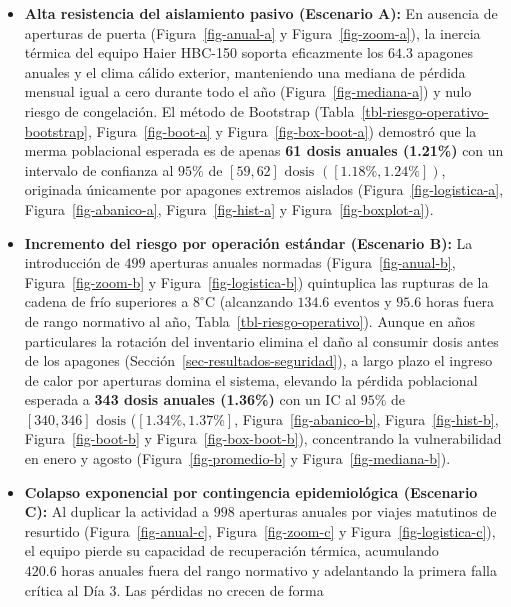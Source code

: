 \documentclass[
  spanish,
  us-letterpaper,
]{scrreprt}
\providecommand{\tightlist}{%
  \setlength{\itemsep}{0pt}\setlength{\parskip}{0pt}}
\numberwithin{equation}{section}
\theoremstyle{plain}
\theoremstyle{plain}
\theoremstyle{plain}
\theoremstyle{definition}
\theoremstyle{remark}
\begin{document}
\begin{itemize}
\tightlist
\item
  \textbf{Alta resistencia del aislamiento pasivo (Escenario A):} En
  ausencia de aperturas de puerta (Figura~\ref{fig-anual-a} y
  Figura~\ref{fig-zoom-a}), la inercia térmica del equipo Haier HBC-150
  soporta eficazmente los \(64.3\) apagones anuales y el clima cálido
  exterior, manteniendo una mediana de pérdida mensual igual a cero
  durante todo el año (Figura~\ref{fig-mediana-a}) y nulo riesgo de
  congelación. El método de Bootstrap
  (Tabla~\ref{tbl-riesgo-operativo-bootstrap}, Figura~\ref{fig-boot-a} y
  Figura~\ref{fig-box-boot-a}) demostró que la merma poblacional
  esperada es de apenas \textbf{61 dosis anuales (1.21\%)} con un
  intervalo de confianza al \(95\%\) de \([59, 62]\text{ dosis}\)
  \(\left( [1.18\%, 1.24\%] \right)\), originada únicamente por apagones
  extremos aislados (Figura~\ref{fig-logistica-a},
  Figura~\ref{fig-abanico-a}, Figura~\ref{fig-hist-a} y
  Figura~\ref{fig-boxplot-a}).
\item
  \textbf{Incremento del riesgo por operación estándar (Escenario B):}
  La introducción de \(499\) aperturas anuales normadas
  (Figura~\ref{fig-anual-b}, Figura~\ref{fig-zoom-b} y
  Figura~\ref{fig-logistica-b}) quintuplica las rupturas de la cadena de
  frío superiores a \(8^\circ\text{C}\) (alcanzando
  \(134.6\text{ eventos}\) y \(95.6\text{ horas}\) fuera de rango
  normativo al año, Tabla~\ref{tbl-riesgo-operativo}). Aunque en años
  particulares la rotación del inventario elimina el daño al consumir
  dosis antes de los apagones (Sección~\ref{sec-resultados-seguridad}),
  a largo plazo el ingreso de calor por aperturas domina el sistema,
  elevando la pérdida poblacional esperada a \textbf{343 dosis anuales
  (1.36\%)} con un IC al \(95\%\) de \([340, 346]\text{ dosis}\)
  (\([1.34\%, 1.37\%]\), Figura~\ref{fig-abanico-b},
  Figura~\ref{fig-hist-b}, Figura~\ref{fig-boot-b} y
  Figura~\ref{fig-box-boot-b}), concentrando la vulnerabilidad en enero
  y agosto (Figura~\ref{fig-promedio-b} y Figura~\ref{fig-mediana-b}).
\item
  \textbf{Colapso exponencial por contingencia epidemiológica (Escenario
  C):} Al duplicar la actividad a \(998\) aperturas anuales por viajes
  matutinos de resurtido (Figura~\ref{fig-anual-c},
  Figura~\ref{fig-zoom-c} y Figura~\ref{fig-logistica-c}), el equipo
  pierde su capacidad de recuperación térmica, acumulando
  \(420.6\text{ horas}\) anuales fuera del rango normativo y adelantando
  la primera falla crítica al Día 3. Las pérdidas no crecen de forma

\end{itemize}
\end{document}
